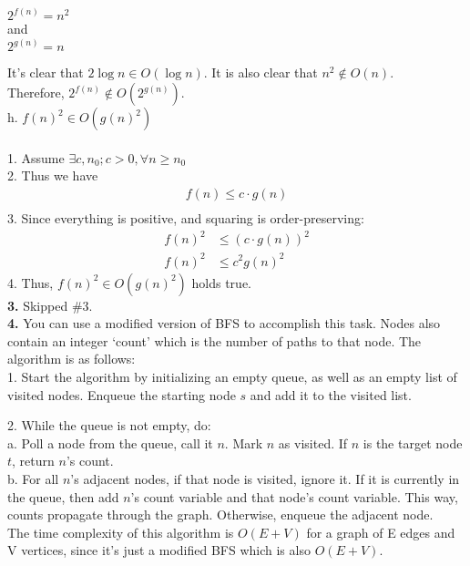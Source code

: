 \documentclass[12pt]{report}
\newcommand{\no}{\noindent}
\newcommand{\tab}{\hspace*{.6cm}}
\begin{document}
	\centering
	$2^{f(n)} = n^2$\\
	and\\
	$2^{g(n)} = n$\\
	\justify
	
	\tab It's clear that $2\log{n} \in O(\log{n})$. It is also clear that $n^2 \notin O(n)$.\\
	Therefore, $2^{f(n)} \notin O(2^{g(n)})$.\\
	
	\no h. 	$f(n)^2 \in O(g(n)^2)$\\\\
	\tab 1. Assume $\exists c, n_0; c > 0, \forall n \geq n_0$\\
	\tab 2. Thus we have 
	\begin{align*}
	f(n) \leq c \cdot g(n) \\
	\end{align*}
	\tab 3. Since everything is positive, and squaring is order-preserving:
	\begin{align*}
	f(n)^2 &\leq (c\cdot g(n))^2\\
	f(n)^2 &\leq c^2g(n)^2
	\end{align*}
	\tab 4. Thus, $f(n)^2 \in O(g(n)^2)$ holds true.\\

	\no \textbf{3.} Skipped \#3.\\

	\no \textbf{4.} You can use a modified version of BFS to accomplish this task. Nodes also contain an integer `count' which is the number of paths to that node. The algorithm is as follows:\\
	
	1. Start the algorithm by initializing an empty queue, as well as an empty list of visited nodes. Enqueue the starting node $s$ and add it to the visited list.
	
	2. While the queue is not empty, do:\\
		\tab\tab a. Poll a node from the queue, call it $n$. Mark $n$ as visited. If $n$ is the target node $t$, return $n$'s count.\\
		\tab\tab b. For all $n$'s adjacent nodes, if that node is visited, ignore it. If it is currently in the queue, then add $n$'s count variable and that node's count variable. This way, counts propagate through the graph. Otherwise, enqueue the adjacent node.\\

	The time complexity of this algorithm is $O(E+V)$ for a graph of E edges and V vertices, since it's just a modified BFS which is also $O(E+V)$.\\
\end{document}
